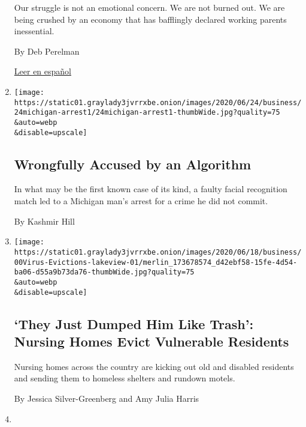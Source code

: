 \begin{enumerate}
  Our struggle is not an emotional concern. We are not burned out. We
  are being crushed by an economy that has bafflingly declared working
  parents inessential.

  By Deb Perelman

  \href{https://www.nytimes3xbfgragh.onion/es/2020/07/09/espanol/estilos-de-vida/trabajo-hijos-coronavirus.html}{Leer
  en español}
\item
  \href{/2020/06/24/technology/facial-recognition-arrest.html}{}

  \texttt{[image: https://static01.graylady3jvrrxbe.onion/images/2020/06/24/business/24michigan-arrest1/24michigan-arrest1-thumbWide.jpg?quality=75\\\&auto=webp\\\&disable=upscale]}

  \hypertarget{wrongfully-accused-by-an-algorithm}{%
  \subsection{Wrongfully Accused by an
  Algorithm}\label{wrongfully-accused-by-an-algorithm}}

  In what may be the first known case of its kind, a faulty facial
  recognition match led to a Michigan man's arrest for a crime he did
  not commit.

  By Kashmir Hill
\item
  \href{/2020/06/21/business/nursing-homes-evictions-discharges-coronavirus.html}{}

  \texttt{[image: https://static01.graylady3jvrrxbe.onion/images/2020/06/18/business/00Virus-Evictions-lakeview-01/merlin\_173678574\_d42ebf58-15fe-4d54-ba06-d55a9b73da76-thumbWide.jpg?quality=75\\\&auto=webp\\\&disable=upscale]}

  \hypertarget{they-just-dumped-him-like-trash-nursing-homes-evict-vulnerable-residents}{%
  \subsection{`They Just Dumped Him Like Trash': Nursing Homes Evict
  Vulnerable
  Residents}\label{they-just-dumped-him-like-trash-nursing-homes-evict-vulnerable-residents}}

  Nursing homes across the country are kicking out old and disabled
  residents and sending them to homeless shelters and rundown motels.

  By Jessica Silver-Greenberg and Amy Julia Harris
\item
  \href{/2020/06/18/business/banks-black-customers-racism.html}{}


\end{enumerate}
